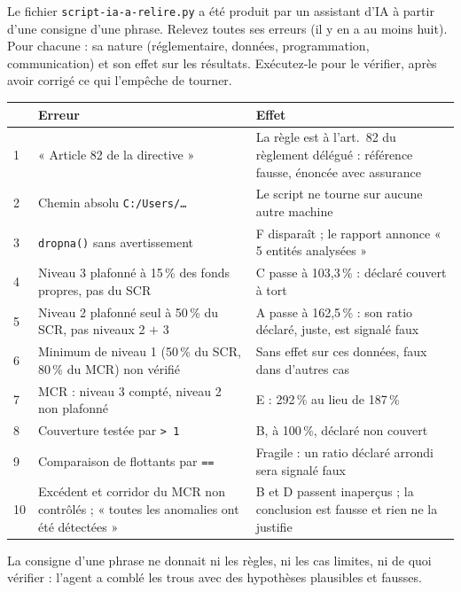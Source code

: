 \documentclass[11pt,a4paper]{article}
\newcommand{\fx}[1]{\texttt{\small #1}}
\begin{document}
\begin{exercice}
Le fichier \texttt{script-ia-a-relire.py} a été produit par un assistant d'IA à partir d'une
consigne d'une phrase. Relevez toutes ses erreurs (il y en a au moins huit). Pour chacune : sa
nature (réglementaire, données, programmation, communication) et son effet sur les résultats.
Exécutez-le pour le vérifier, après avoir corrigé ce qui l'empêche de tourner.
\end{exercice}
\begin{corrige}
\small
\begin{tabular}{p{0.3cm}p{6.6cm}p{7.2cm}}
\toprule
 & Erreur & Effet \\
\midrule
1 & « Article 82 de la directive » & La règle est à l'art.~82 du règlement délégué : référence fausse, énoncée avec assurance \\
2 & Chemin absolu \fx{C:/Users/…} & Le script ne tourne sur aucune autre machine \\
3 & \fx{dropna()} sans avertissement & F disparaît ; le rapport annonce « 5 entités analysées » \\
4 & Niveau 3 plafonné à 15\,\% des fonds propres, pas du SCR & C passe à 103,3\,\% : déclaré couvert à tort \\
5 & Niveau 2 plafonné seul à 50\,\% du SCR, pas niveaux 2 $+$ 3 & A passe à 162,5\,\% : son ratio déclaré, juste, est signalé faux \\
6 & Minimum de niveau 1 (50\,\% du SCR, 80\,\% du MCR) non vérifié & Sans effet sur ces données, faux dans d'autres cas \\
7 & MCR : niveau 3 compté, niveau 2 non plafonné & E : 292\,\% au lieu de 187\,\% \\
8 & Couverture testée par \fx{> 1} & B, à 100\,\%, déclaré non couvert \\
9 & Comparaison de flottants par \fx{==} & Fragile : un ratio déclaré arrondi sera signalé faux \\
10 & Excédent et corridor du MCR non contrôlés ; « toutes les anomalies ont été détectées » & B et D passent inaperçus ; la conclusion est fausse et rien ne la justifie \\
\bottomrule
\end{tabular}

\smallskip
\normalsize
La consigne d'une phrase ne donnait ni les règles, ni les cas limites, ni de quoi vérifier : l'agent
a comblé les trous avec des hypothèses plausibles et fausses.
\end{corrige}
\end{document}
